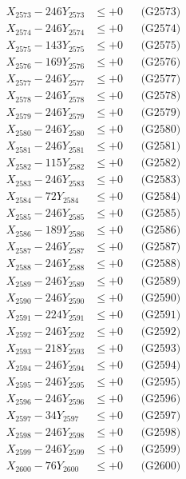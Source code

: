 \documentclass[a4paper,10pt]{article}
\begin{document}
{\begin{align}
X_{2573} - 246Y_{2573} &\leq +0 && \text{(G2573)} \\
X_{2574} - 246Y_{2574} &\leq +0 && \text{(G2574)} \\
X_{2575} - 143Y_{2575} &\leq +0 && \text{(G2575)} \\
X_{2576} - 169Y_{2576} &\leq +0 && \text{(G2576)} \\
X_{2577} - 246Y_{2577} &\leq +0 && \text{(G2577)} \\
X_{2578} - 246Y_{2578} &\leq +0 && \text{(G2578)} \\
X_{2579} - 246Y_{2579} &\leq +0 && \text{(G2579)} \\
X_{2580} - 246Y_{2580} &\leq +0 && \text{(G2580)} \\
\allowbreak
X_{2581} - 246Y_{2581} &\leq +0 && \text{(G2581)} \\
X_{2582} - 115Y_{2582} &\leq +0 && \text{(G2582)} \\
X_{2583} - 246Y_{2583} &\leq +0 && \text{(G2583)} \\
X_{2584} - 72Y_{2584} &\leq +0 && \text{(G2584)} \\
X_{2585} - 246Y_{2585} &\leq +0 && \text{(G2585)} \\
X_{2586} - 189Y_{2586} &\leq +0 && \text{(G2586)} \\
X_{2587} - 246Y_{2587} &\leq +0 && \text{(G2587)} \\
X_{2588} - 246Y_{2588} &\leq +0 && \text{(G2588)} \\
X_{2589} - 246Y_{2589} &\leq +0 && \text{(G2589)} \\
X_{2590} - 246Y_{2590} &\leq +0 && \text{(G2590)} \\
\allowbreak
X_{2591} - 224Y_{2591} &\leq +0 && \text{(G2591)} \\
X_{2592} - 246Y_{2592} &\leq +0 && \text{(G2592)} \\
X_{2593} - 218Y_{2593} &\leq +0 && \text{(G2593)} \\
X_{2594} - 246Y_{2594} &\leq +0 && \text{(G2594)} \\
X_{2595} - 246Y_{2595} &\leq +0 && \text{(G2595)} \\
X_{2596} - 246Y_{2596} &\leq +0 && \text{(G2596)} \\
X_{2597} - 34Y_{2597} &\leq +0 && \text{(G2597)} \\
X_{2598} - 246Y_{2598} &\leq +0 && \text{(G2598)} \\
X_{2599} - 246Y_{2599} &\leq +0 && \text{(G2599)} \\
X_{2600} - 76Y_{2600} &\leq +0 && \text{(G2600)} \\

\end{align}}
\end{document}
